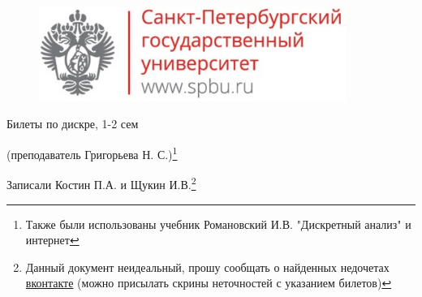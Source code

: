 \documentclass[12pt, fleqn]{article}
\begin{document}
  \begin{figure}[H]
      \includegraphics[width=10cm]{../../../template/spsu.jpg}
      \centering
  \end{figure}
  \vspace*{\fill}
  \begin{center}
    \huge Билеты по дискре, 1-2 сем

    \Large (преподаватель Григорьева Н. С.)\footnote{Также были использованы учебник Романовский И.В. "Дискретный анализ"{} и интернет}

    \large Записали Костин П.А. и Щукин И.В.\footnote{Данный документ неидеальный, прошу сообщать о найденных недочетах \href{https://vk.com/drab_existence_a}{вконтакте} (можно присылать скрины неточностей с указанием билетов)}
  \end{center}
  \vspace*{\fill}
  \vspace*{\fill}
  
  \newpage
  \tableofcontents
  \newpage

  

  

  

  

  
\end{document}
